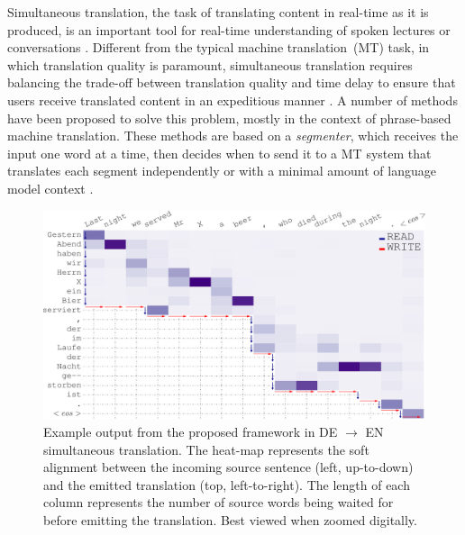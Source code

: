 
Simultaneous translation, the task of translating content in real-time as it is produced, is an important tool for real-time understanding of spoken lectures or conversations \cite{fugen2007simultaneous,bangalore2012real}.
Different from the typical machine translation~(MT) task, in which translation quality is paramount, simultaneous translation requires balancing the trade-off between translation quality and time delay to ensure that users receive translated content in an expeditious manner \cite{mieno2015speed}.
A number of methods have been proposed to solve this problem, mostly in the context of phrase-based machine translation.
These methods are based on a \textit{segmenter}, which receives the input one word at a time, then decides when to send it to a MT system that translates each segment independently \cite{oda-EtAl:2014:P14-2} or with a minimal amount of language model context \cite{bangalore2012real}.
\begin{figure}[!t]
   	\centering
          	\includegraphics[width=\linewidth]{figs/simultrans/cropped_kkkk.pdf} 
          	\caption{\label{crop} {Example output from the proposed framework in DE $\rightarrow$ EN simultaneous translation. The heat-map represents the soft alignment between the incoming source sentence (left, up-to-down) and the emitted translation (top, left-to-right). The length of each column represents the number of source words being waited for before emitting the translation. Best viewed when zoomed digitally.}}
\end{figure} 

